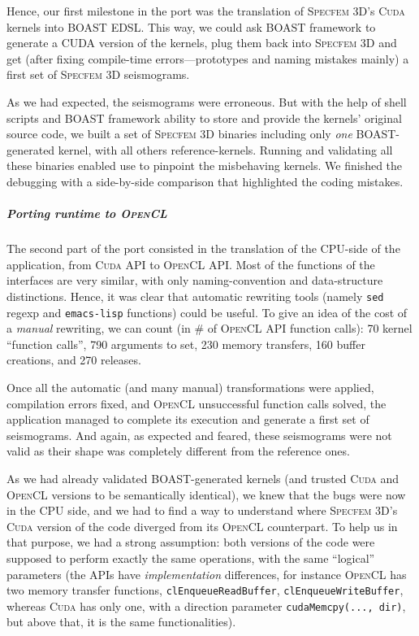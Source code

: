 \documentclass[11pt, a4paper, twoside]{montblanc}
\newcommand{\productname}[1]{\textsc{#1}}
\newcommand{\Specfem}{\productname{Specfem 3D}\xspace}
\newcommand{\Cuda}{\productname{Cuda}\xspace}
\newcommand{\OCL}{\productname{OpenCL}\xspace}
\newcommand{\code}[1]{\texttt{#1}}
\begin{document}
Hence, our first milestone in the port was the translation of
\Specfem's \Cuda kernels into BOAST EDSL. This way, we could ask BOAST
framework to generate a CUDA version of the kernels, plug them back
into \Specfem and get (after fixing compile-time errors---prototypes
and naming mistakes mainly) a first set of \Specfem seismograms.

As we had expected, the seismograms were erroneous. But with the help
of shell scripts and BOAST framework ability to store and provide the
kernels' original source code, we built a set of \Specfem binaries
including only \emph{one} BOAST-generated kernel, with all others
reference-kernels. Running and validating all these binaries enabled
use to pinpoint the misbehaving kernels. We finished the debugging
with a side-by-side comparison that highlighted the coding mistakes.

\subparagraph{Porting runtime to \OCL} The second part of the port
consisted in the translation of the CPU-side of the application, from
\Cuda API to \OCL API. Most of the functions of the interfaces are
very similar, with only naming-convention and data-structure
distinctions. Hence, it was clear that automatic rewriting tools
(namely \code{sed} regexp and \code{emacs-lisp} functions) could be
useful. To give an idea of the cost of a \emph{manual} rewriting, we
can count (in \# of \OCL API function calls): 70 kernel ``function
calls'', 790 arguments to set, 230 memory transfers, 160 buffer
creations, and 270 releases.

Once all the automatic (and many manual) transformations were applied,
compilation errors fixed, and \OCL unsuccessful function calls solved,
the application managed to complete its execution and generate a first
set of seismograms. And again, as expected and feared, these
seismograms were not valid as their shape was completely different from the
reference ones.

As we had already validated BOAST-generated kernels (and trusted \Cuda
and \OCL versions to be semantically identical), we knew that the bugs
were now in the CPU side, and we had to find a way to understand where
\Specfem's \Cuda version of the code diverged from its \OCL
counterpart. To help us in that purpose, we had a strong assumption:
both versions of the code were supposed to perform exactly the same
operations, with the same ``logical'' parameters (the APIs have
\emph{implementation} differences, for instance \OCL has two memory
transfer functions, \code{clEnqueueReadBuffer},
\code{clEnqueueWriteBuffer}, whereas \Cuda has only one, with a
direction parameter \code{cudaMemcpy(..., dir)}, but above that, it is
the same functionalities).
\end{document}
